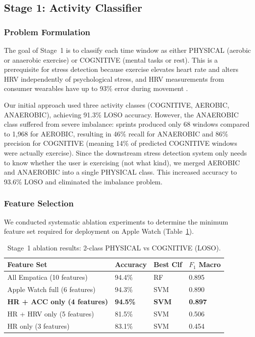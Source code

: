 \documentclass[12pt,letterpaper]{article}
\begin{document}
\subsection{Stage 1: Activity Classifier}

\subsubsection{Problem Formulation}

The goal of Stage~1 is to classify each time window as either PHYSICAL (aerobic or anaerobic exercise) or COGNITIVE (mental tasks or rest). This is a prerequisite for stress detection because exercise elevates heart rate and alters HRV independently of psychological stress, and HRV measurements from consumer wearables have up to 93\% error during movement \citep{bonneval2025hrv}.

Our initial approach used three activity classes (COGNITIVE, AEROBIC, ANAEROBIC), achieving 91.3\% LOSO accuracy. However, the ANAEROBIC class suffered from severe imbalance: sprints produced only 68 windows compared to 1,968 for AEROBIC, resulting in 46\% recall for ANAEROBIC and 86\% precision for COGNITIVE (meaning 14\% of predicted COGNITIVE windows were actually exercise). Since the downstream stress detection system only needs to know whether the user is exercising (not what kind), we merged AEROBIC and ANAEROBIC into a single PHYSICAL class. This increased accuracy to 93.6\% LOSO and eliminated the imbalance problem.

\subsubsection{Feature Selection}

We conducted systematic ablation experiments to determine the minimum feature set required for deployment on Apple Watch (Table~\ref{tab:stage1-ablation}).

\begin{table}[H]
\centering
\caption{Stage~1 ablation results: 2-class PHYSICAL vs COGNITIVE (LOSO).}
\label{tab:stage1-ablation}
\begin{tabular}{p{5cm}lll}
\toprule
\textbf{Feature Set} & \textbf{Accuracy} & \textbf{Best Clf} & \textbf{$F_1$ Macro} \\
\midrule
All Empatica (10 features) & 94.4\% & RF & 0.895 \\
Apple Watch full (6 features) & 94.3\% & SVM & 0.890 \\
\textbf{HR + ACC only (4 features)} & \textbf{94.5\%} & \textbf{SVM} & \textbf{0.897} \\
HR + HRV only (5 features) & 81.5\% & SVM & 0.506 \\
HR only (3 features) & 83.1\% & SVM & 0.454 \\
\bottomrule
\end{tabular}
\end{table}
\end{document}
